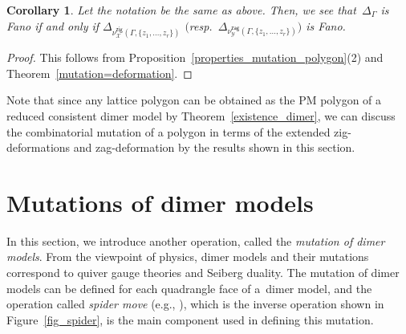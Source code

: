\documentclass[pdftex]{sigma}%
\numberwithin{equation}{section}
\numberwithin{figure}{section}
\numberwithin{table}{section}
\newtheorem{Corollary}[Theorem]{Corollary}
\newcommand{\calX}{\mathcal{X}}
\newcommand{\calY}{\mathcal{Y}}
\newcommand{\zig}{\mathsf{zig}}
\newcommand{\zag}{\mathsf{zag}}
\begin{document}
\begin{Corollary}\label{cor_Fano_deformedDM}
Let the notation be the same as above. Then, we see that~$\Delta_\Gamma$ is Fano if and only if $\Delta_{\nu^\zig_\calX(\Gamma, \{z_1,\dots,z_r\})}$ $($resp.\ $\Delta_{\nu^\zag_\calY(\Gamma, \{z_1,\dots,z_r\})}$$)$ is Fano.
\end{Corollary}

\begin{proof}This follows from Proposition~\ref{properties_mutation_polygon}(2) and Theorem~\ref{mutation=deformation}.
\end{proof}

Note that since any lattice polygon can be obtained as the PM polygon of a reduced consistent dimer model by Theorem~\ref{existence_dimer},
we can discuss the combinatorial mutation of a polygon in terms of the extended zig-deformations and zag-deformation by the results shown in this section.

\appendix
\section{Mutations of dimer models}\label{app_mutationdimer}

In this section, we introduce another operation, called the \emph{mutation of dimer models}.
From the viewpoint of physics, dimer models and their mutations correspond to quiver gauge theories and Seiberg duality.
The mutation of dimer models can be defined for each quadrangle face of a~dimer model, and the operation called \emph{spider move} (e.g., \cite{Boc_abc, GK}), which is the inverse operation shown in Figure~\ref{fig_spider}, is the main component used in defining this mutation.
\end{document}
